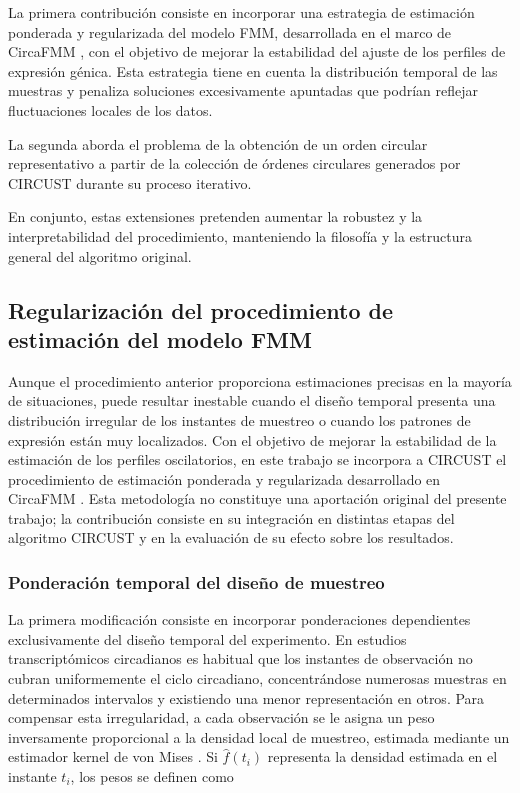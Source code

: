 \documentclass[12pt, a4paper]{report}
\begin{document}
La primera contribución consiste en incorporar una estrategia de estimación ponderada y regularizada del modelo FMM, desarrollada en el marco de CircaFMM \citep{Abston2026CircaFMM}, con el objetivo de mejorar la estabilidad del ajuste de los perfiles de expresión génica. Esta estrategia tiene en cuenta la distribución temporal de las muestras y penaliza soluciones excesivamente apuntadas que podrían reflejar fluctuaciones locales de los datos. 

La segunda aborda el problema de la obtención de un orden circular representativo a partir de la colección de órdenes circulares generados por CIRCUST durante su proceso iterativo.

En conjunto, estas extensiones pretenden aumentar la robustez y la interpretabilidad del procedimiento, manteniendo la filosofía y la estructura general del algoritmo original.

\subsection{Regularización del procedimiento de estimación del modelo FMM}
\label{sec:regularizacionFMM}

Aunque el procedimiento anterior proporciona estimaciones precisas en la mayoría de situaciones, puede resultar inestable cuando el diseño temporal presenta una distribución irregular de los instantes de muestreo o cuando los patrones de expresión están muy localizados. Con el objetivo de mejorar la estabilidad de la estimación de los perfiles oscilatorios, en este trabajo se incorpora a CIRCUST el procedimiento de estimación ponderada y regularizada desarrollado en CircaFMM \citep{Abston2026CircaFMM}. Esta metodología no constituye una aportación original del presente trabajo; la contribución consiste en su integración en distintas etapas del algoritmo CIRCUST y en la evaluación de su efecto sobre los resultados.

\subsubsection{Ponderación temporal del diseño de muestreo}
La primera modificación consiste en incorporar ponderaciones dependientes exclusivamente del diseño temporal del experimento. En estudios transcriptómicos circadianos es habitual que los instantes de observación no cubran uniformemente el ciclo circadiano, concentrándose numerosas muestras en determinados intervalos y existiendo una menor representación en otros. Para compensar esta irregularidad, a cada observación se le asigna un peso inversamente proporcional a la densidad local de muestreo, estimada mediante un estimador kernel de von Mises \cite{Mardia2000}. Si \(\widehat{f}(t_i)\) representa la densidad estimada en el instante \(t_i\), los pesos se definen como
\end{document}
